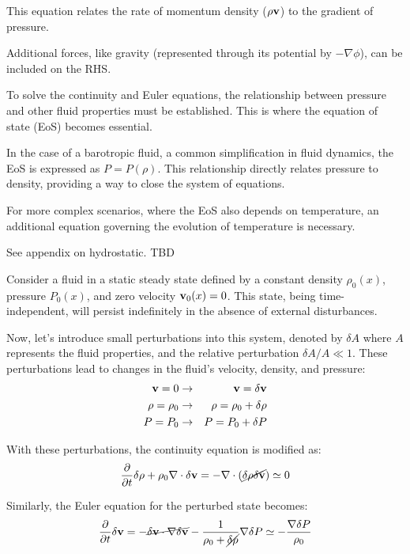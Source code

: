 This equation relates the rate of momentum density (\( \rho \vb v \)) to the gradient of pressure.

Additional forces, like gravity (represented through its potential by \( - \nabla \phi \)), can be included on the RHS.

To solve the continuity and Euler equations, the relationship between pressure and other fluid properties must be established. This is where the equation of state (EoS) becomes essential.

In the case of a barotropic fluid, a common simplification in fluid dynamics, the EoS is expressed as \( P=P(\rho) \). This relationship directly relates pressure to density, providing a way to close the system of equations.

For more complex scenarios, where the EoS also depends on temperature, an additional equation governing the evolution of temperature is necessary. 

{\color{red}See appendix on hydrostatic. TBD}

Consider a fluid in a static steady state defined by a constant density \( \rho_0(x) \), pressure \( P_0(x) \), and zero velocity \( \vb v_0(x) = 0 \). This state, being time-independent, will persist indefinitely in the absence of external disturbances.

Now, let's introduce small perturbations into this system, denoted by \( \delta A \) where \( A \) represents the fluid properties, and the relative perturbation \( \delta A / A \ll 1 \). 
%
These perturbations lead to changes in the fluid's velocity, density, and pressure:
%
\begin{eqnarray}
\vb v = 0 & \rightarrow & \vb v = \delta \vb v \\
\rho = \rho_0 & \rightarrow & \rho = \rho_0 + \delta \rho \\
P = P_0 & \rightarrow & P = P_0 + \delta P
\end{eqnarray}

With these perturbations, the continuity equation is modified as:
%
\begin{equation}
\frac{\partial}{\partial t} \delta \rho + \rho_0 \nabla \cdot \delta \vb v = - \nabla \cdot ( \cancel{\delta \rho \delta \vb v}) \simeq 0
\end{equation}

Similarly, the Euler equation for the perturbed state becomes:
%
\begin{equation}
\frac{\partial}{\partial t} \delta \vb v = -\cancel{\delta \vb v \cdot \nabla \delta \vb v} - \frac{1}{\rho_0 + \cancel{\delta \rho}} \nabla \delta P \simeq - \frac{\nabla \delta P}{\rho_0} 
\end{equation}

